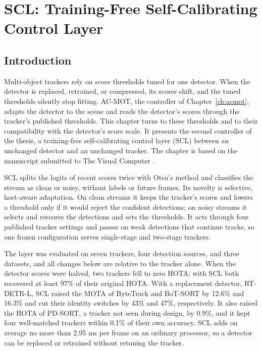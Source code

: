 \chapter{SCL: Training-Free Self-Calibrating Control Layer}\label{ch:scl}

\section{Introduction}\label{sec:scl-intro}
Multi-object trackers rely on score thresholds tuned for one detector. When the detector is replaced, retrained, or compressed, its scores shift, and the tuned thresholds silently stop fitting. AC-MOT, the controller of Chapter~\ref{ch:acmot}, adapts the detector to the scene and reads the detector's scores through the tracker's published thresholds. This chapter turns to these thresholds and to their compatibility with the detector's score scale. It presents the second controller of the thesis, a training-free self-calibrating control layer (SCL) between an unchanged detector and an unchanged tracker. The chapter is based on the manuscript submitted to The Visual Computer \cite{ismail2026scl}.

SCL splits the logits of recent scores twice with Otsu's method and classifies the stream as clean or noisy, without labels or future frames. Its novelty is selective, host-aware adaptation. On clean streams it keeps the tracker's scores and lowers a threshold only if it would reject the confident detections; on noisy streams it selects and rescores the detections and sets the thresholds. It acts through four published tracker settings and passes on weak detections that continue tracks, so one frozen configuration serves single-stage and two-stage trackers.

The layer was evaluated on seven trackers, four detection sources, and three datasets, and all changes below are relative to the tracker alone. When the detector scores were halved, two trackers fell to zero HOTA; with SCL both recovered at least 97\% of their original HOTA. With a replacement detector, RT-DETR-L, SCL raised the MOTA of ByteTrack and BoT-SORT by 12.6\% and 16.3\% and cut their identity switches by 43\% and 47\%, respectively. It also raised the HOTA of PD-SORT, a tracker not seen during design, by 0.9\%, and it kept four well-matched trackers within 0.1\% of their own accuracy. SCL adds on average no more than 2.95 ms per frame on an ordinary processor, so a detector can be replaced or retrained without retuning the tracker.

